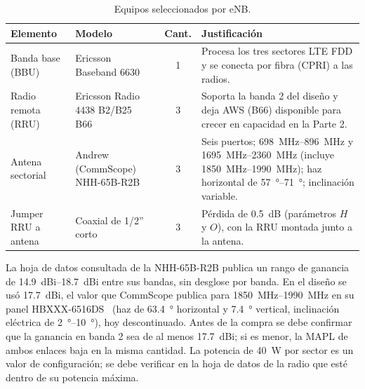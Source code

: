 \documentclass[11pt,letterpaper]{article}
\begin{document}
\begin{table}[H]
\centering
\caption{Equipos seleccionados por eNB.}
\label{tab:equipos}
\small
\begin{tabularx}{\textwidth}{@{}l>{\raggedright\arraybackslash}p{3.6cm}cL@{}}
\toprule
\textbf{Elemento} & \textbf{Modelo} & \textbf{Cant.} & \textbf{Justificación} \\
\midrule
Banda base (BBU) & Ericsson Baseband 6630 & 1 & Procesa los tres sectores LTE FDD y se conecta por fibra (CPRI) a las radios. \\
Radio remota (RRU) & Ericsson Radio 4438 B2/B25 B66~\cite{ericsson} & 3 & Soporta la banda 2 del diseño y deja AWS (B66) disponible para crecer en capacidad en la Parte 2. \\
Antena sectorial & Andrew (CommScope) NHH-65B-R2B~\cite{nhh} & 3 & Seis puertos; \SIrange{698}{896}{MHz} y \SIrange{1695}{2360}{MHz} (incluye \SIrange{1850}{1990}{MHz}); haz horizontal de \SIrange{57}{71}{\degree}; inclinación variable. \\
Jumper RRU a antena & Coaxial de 1/2'' corto & 3 & Pérdida de \SI{0.5}{dB} (parámetros $H$ y $O$), con la RRU montada junto a la antena. \\
\bottomrule
\end{tabularx}
\end{table}

La hoja de datos consultada de la NHH-65B-R2B publica un rango de ganancia de \SIrange{14.9}{18.7}{dBi} entre sus bandas, sin desglose por banda. En el diseño se usó \SI{17.7}{dBi}, el valor que CommScope publica para \SIrange{1850}{1990}{MHz} en su panel HBXXX-6516DS~\cite{hbxxx} (haz de \SI{63.4}{\degree} horizontal y \SI{7.4}{\degree} vertical, inclinación eléctrica de \SIrange{2}{10}{\degree}), hoy descontinuado. Antes de la compra se debe confirmar que la ganancia en banda 2 sea de al menos \SI{17.7}{dBi}; si es menor, la MAPL de ambos enlaces baja en la misma cantidad. La potencia de \SI{40}{W} por sector es un valor de configuración; se debe verificar en la hoja de datos de la radio que esté dentro de su potencia máxima.
\end{document}

